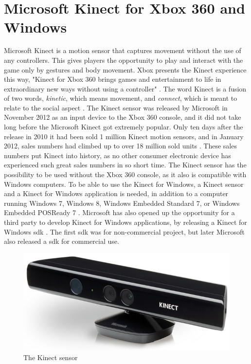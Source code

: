 \section{Microsoft Kinect for Xbox 360 and Windows}
Microsoft Kinect is a motion sensor that captures movement without the use of any controllers. This gives players the opportunity to play and interact with the game only by gestures and body movement. Xbox presents the Kinect experience this way, "Kinect for Xbox 360 brings games and entertainment to life in extraordinary new ways without using a controller" \cite{kinectxboxdef}. The word Kinect is a fusion of two words, \emph{kinetic}, which means movement, and \emph{connect}, which is meant to relate to the social aspect \cite{howstuffworksKinect}. The Kinect sensor was released by Microsoft in November 2012 as an input device to the Xbox 360 console, and it did not take long before the Microsoft Kinect got extremely popular. Only ten days after the release in 2010 it had been sold 1 million Kinect motion sensors, and in January 2012, sales numbers had climbed up to over 18 million sold units \cite{kinectsales}. These sales numbers put Kinect into history, as no other consumer electronic device has experienced such great sales numbers in so short time. The Kinect sensor has the possibility to be used without the Xbox 360 console, as it also is compatible with Windows computers. To be able to use the Kinect for Windows, a Kinect sensor and a Kinect for Windows application is needed, in addition to a computer running Windows 7, Windows 8, Windows Embedded Standard 7, or Windows Embedded POSReady 7 \cite{kinectforwindows}. Microsoft has also opened up the opportunity for a third party to develop Kinect for Windows applications, by releasing a Kinect for Windows \ac{sdk} \cite{kinectforwindows}. The first \ac{sdk} was for non-commercial project, but later Microsoft also released a \ac{sdk} for commercial use. 

\begin{figure} [ht!]
\centering
\includegraphics[scale=0.4]{kinect.jpg}
\caption{The Kinect sensor}
\label{kinectsensor}
\end{figure} 
 
